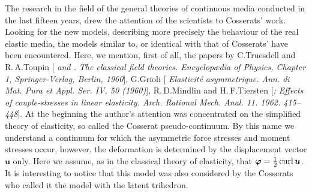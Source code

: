 \begin{otherlanguage}{russian}
\begin{tcolorbox}[breakable, enhanced, colback = orange!8, before upper={\parindent3.2ex}, parbox = false]
The research in the field of the general theories of continuous media conducted in the last fifteen years, drew the attention of the scientists to Cosserats’ work. Looking for the new models, describing more precisely the behaviour of the real elastic media, the models similar to, or identical with that of Cosserats’ have been encountered. Here, we mention, first of all, the papers by C.\:Truesdell and R.\,A.\;Toupin [\textit{ and . The classical field theories. Encyclopædia of Physics, Chapter 1, Springer\hbox{-}Verlag, Berlin, 1960}], G.\:Grioli [\textit{ Elasticité asymmetrique. Ann. di Mat. Pura et Appl. Ser. IV, 50 (1960)}], R.\,D.\;Mindlin and H.\,F.\;Tiersten [\textit{;  Effects of couple-stresses in linear elasticity. Arch. Rational Mech. Anal. 11. 1962. 415\hbox{--}448}]. At the beginning the author’s attention was concentrated on the simplified theory of elasticity, so called the Cosserat pseudo-continuum. By this name we understand a continuum for which the asymmetric force stresses and moment stresses occur, however, the deformation is determined by the displacement vector $\bm{u}$ only. Here we assume, as in the classical theory of elasticity, that $\bm{\varphi} = \onehalf \operatorname{curl} \bm{u}$. It is interesting to notice that this model was also considered by the Cosserats who called it the model with the latent trihedron.
\par
\end{tcolorbox}

\vspace{2mm}


\end{otherlanguage}
